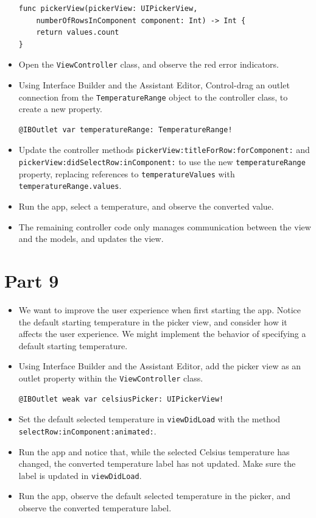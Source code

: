 \documentclass[a4paper,11pt]{scrartcl}
\begin{document}
\begin{itemize}
\begin{lstlisting}
func pickerView(pickerView: UIPickerView,
	numberOfRowsInComponent component: Int) -> Int {
	return values.count
}
\end{lstlisting}
\item Open the \texttt{ViewController} class, and observe the red error indicators.
\item Using Interface Builder and the Assistant Editor, Control-drag an outlet connection from the \texttt{TemperatureRange} object to the controller class, to create a new property.
\begin{lstlisting}
@IBOutlet var temperatureRange: TemperatureRange!
\end{lstlisting}
\item Update the controller methods \texttt{pickerView:titleForRow:forComponent:} and \\\texttt{pickerView:didSelectRow:inComponent:} to use the new \texttt{temperatureRange} property, replacing references to \texttt{temperatureValues} with \texttt{temperatureRange.values}.
\item Run the app, select a temperature, and observe the converted value.
\item The remaining controller code only manages communication between the view and the models, and updates the view.
\end{itemize}

\section*{Part 9}

\begin{itemize}
\item We want to improve the user experience when first starting the app. Notice the default starting temperature in the picker view, and consider how it affects the user experience. We might implement the behavior of specifying a default starting temperature.
\item Using Interface Builder and the Assistant Editor, add the picker view as an outlet property within the \texttt{ViewController} class.
\begin{lstlisting}
@IBOutlet weak var celsiusPicker: UIPickerView!
\end{lstlisting}
\item Set the default selected temperature in \texttt{viewDidLoad} with the method \\\texttt{selectRow:inComponent:animated:}.
\item Run the app and notice that, while the selected Celsius temperature has changed, the converted temperature label has not updated. Make sure the label is updated in \texttt{viewDidLoad}.
\item Run the app, observe the default selected temperature in the picker, and observe the converted temperature label.
\end{itemize}
\end{document}
